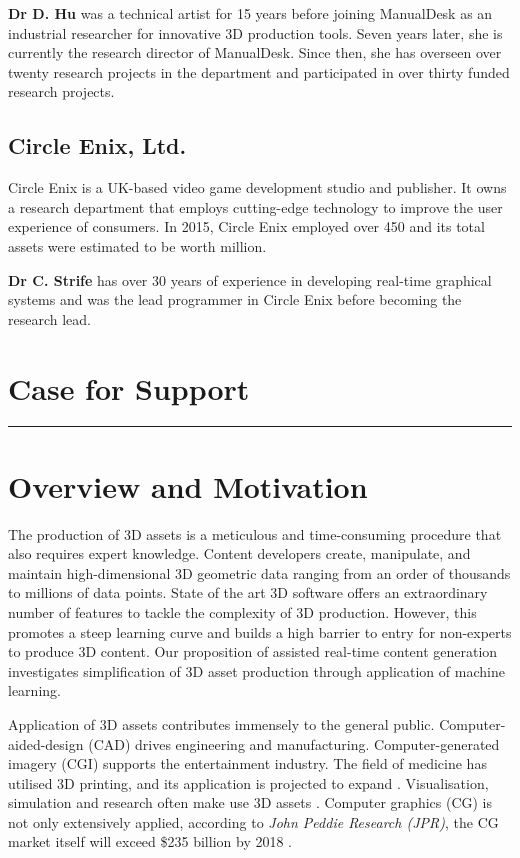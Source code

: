 \documentclass[a4paper, 11pt, onecolumn]{article} %
\numberwithin{equation}{section} %
\numberwithin{figure}{section} %
\numberwithin{table}{section} %
\begin{document}
\textbf{Dr D. Hu} was a technical artist for 15 years before joining ManualDesk as an industrial researcher for innovative 3D production tools. Seven years later, she is currently the research director of ManualDesk. Since then, she has overseen over twenty research projects in the department and participated in over thirty funded research projects.

\subsection*{Circle Enix, Ltd.}
Circle Enix is a UK-based video game development studio and publisher. It owns a research department that employs cutting-edge technology to improve the user experience of consumers. In 2015, Circle Enix employed over 450 and its total assets were estimated to be worth  million. 

\textbf{Dr C. Strife} has over 30 years of experience in developing real-time graphical systems and was the lead programmer in Circle Enix before becoming the research lead.

\newpage

\section*{Case for Support}
\hrule\vspace{0.5em}
\section{Overview and Motivation}
\label{motivation}
The production of 3D assets is a meticulous and time-consuming procedure that also requires expert knowledge. Content developers create, manipulate, and maintain high-dimensional 3D geometric data ranging from an order of thousands to millions of data points. State of the art 3D software offers an extraordinary number of features to tackle the complexity of 3D production. However, this promotes a steep learning curve and builds a high barrier to entry for non-experts to produce 3D content. Our proposition of assisted real-time content generation investigates simplification of 3D asset production through application of machine learning.

Application of 3D assets contributes immensely to the general public.
Computer-aided-design (CAD) drives engineering and manufacturing.
Computer-generated imagery (CGI) supports the entertainment industry.
The field of medicine has utilised 3D printing, and its application is projected to expand \cite{3dprinting}.
Visualisation, simulation and research often make use 3D assets \cite{simulation}.
Computer graphics (CG) is not only extensively applied, according to \textit{John Peddie Research (JPR)}, the CG market itself will exceed \$235 billion by 2018 \cite{cgmarket}.
\end{document}
